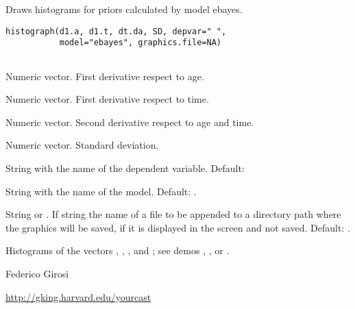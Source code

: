 %
\begin{Description}\relax
Draws histograms for priors calculated by model ebayes.
\end{Description}
%
\begin{Usage}
\begin{verbatim}
histograph(d1.a, d1.t, dt.da, SD, depvar=" ",
           model="ebayes", graphics.file=NA)
  
\end{verbatim}
\end{Usage}
%
\begin{Arguments}
\begin{ldescription}
\item[\code{d1.a}] Numeric vector. First derivative respect to age.

\item[\code{d1.t}] Numeric vector. First derivative respect to time.

\item[\code{dt.da}] Numeric vector. Second derivative respect to age
and time.

\item[\code{SD}] Numeric vector. Standard deviation.

\item[\code{depvar}] String with the name of the dependent
variable. Default: 

\item[\code{model}] String with the name of the model. Default: .

\item[\code{graphics.file}] String or . If string the name of a file to be 
appended to a directory path where the graphics will be saved, if 
it is displayed in the screen and not saved.  Default: .

\end{ldescription}
\end{Arguments}
%
\begin{Value}

Histograms of the vectors , , , and ;
see demos , , or .
\end{Value}
%
\begin{Author}\relax
Federico Girosi 
\end{Author}
%
\begin{References}\relax
 \url{http://gking.harvard.edu/yourcast}  
\end{References}
